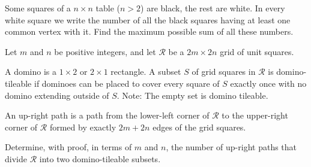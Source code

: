 \begin{problem}[IZhO 2020]
    Some squares of a $n \times n$ table ($n>2$) are black, the rest are white. In every white square we write the number of all the black squares having at least one common vertex with it. Find the maximum possible sum of all these numbers.
\end{problem}
\begin{problem}[USAJMO 2025]
Let $m$ and $n$ be positive integers, and let $\mathcal R$ be a $2m\times{2n}$ grid of unit squares.

A domino is a $1\times2{}$ or $2\times{1}$ rectangle. A subset $S$ of grid squares in $\mathcal R$ is domino-tileable if dominoes can be placed to cover every square of $S$ exactly once with no domino extending outside of $S$. Note: The empty set is domino tileable.

An up-right path is a path from the lower-left corner of $\mathcal R$ to the upper-right corner of $\mathcal R$ formed by exactly $2m+2n$ edges of the grid squares.

Determine, with proof, in terms of $m$ and $n$, the number of up-right paths that divide $\mathcal R$ into two domino-tileable subsets.
\end{problem}


